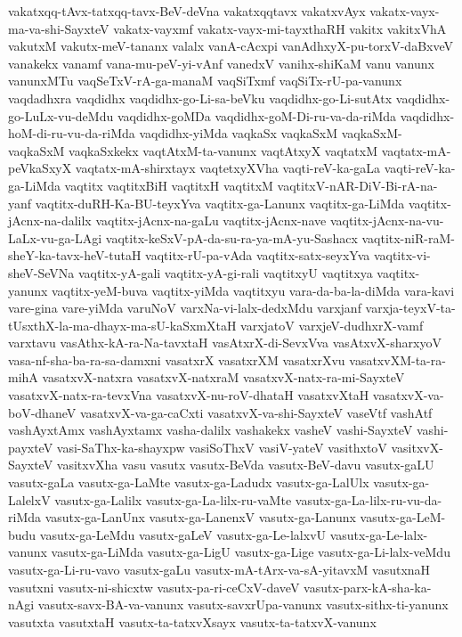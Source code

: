 {vakatxqq-tAvx-tatxqq-tavx-BeV-deVna
vakatxqqtavx
vakatxvAyx
vakatx-vayx-ma-va-shi-SayxteV
vakatx-vayxmf
vakatx-vayx-mi-tayxthaRH
vakitx
vakitxVhA
vakutxM
vakutx-meV-tananx
valalx
vanA-cAcxpi
vanAdhxyX-pu-torxV-daBxveV
vanakekx
vanamf
vana-mu-peV-yi-vAnf
vanedxV
vanihx-shiKaM
vanu
vanunx
vanunxMTu
vaqSeTxV-rA-ga-manaM
vaqSiTxmf
vaqSiTx-rU-pa-vanunx
vaqdadhxra
vaqdidhx
vaqdidhx-go-Li-sa-beVku
vaqdidhx-go-Li-sutAtx
vaqdidhx-go-LuLx-vu-deMdu
vaqdidhx-goMDa
vaqdidhx-goM-Di-ru-va-da-riMda
vaqdidhx-hoM-di-ru-vu-da-riMda
vaqdidhx-yiMda
vaqkaSx
vaqkaSxM
vaqkaSxM-vaqkaSxM
vaqkaSxkekx
vaqtAtxM-ta-vanunx
vaqtAtxyX
vaqtatxM
vaqtatx-mA-peVkaSxyX
vaqtatx-mA-shirxtayx
vaqtetxyXVha
vaqti-reV-ka-gaLa
vaqti-reV-ka-ga-LiMda
vaqtitx
vaqtitxBiH
vaqtitxH
vaqtitxM
vaqtitxV-nAR-DiV-Bi-rA-na-yanf
vaqtitx-duRH-Ka-BU-teyxYva
vaqtitx-ga-Lanunx
vaqtitx-ga-LiMda
vaqtitx-jAcnx-na-dalilx
vaqtitx-jAcnx-na-gaLu
vaqtitx-jAcnx-nave
vaqtitx-jAcnx-na-vu-LaLx-vu-ga-LAgi
vaqtitx-keSxV-pA-da-su-ra-ya-mA-yu-Sashacx
vaqtitx-niR-raM-sheY-ka-tavx-heV-tutaH
vaqtitx-rU-pa-vAda
vaqtitx-satx-seyxYva
vaqtitx-vi-sheV-SeVNa
vaqtitx-yA-gali
vaqtitx-yA-gi-rali
vaqtitxyU
vaqtitxya
vaqtitx-yanunx
vaqtitx-yeM-buva
vaqtitx-yiMda
vaqtitxyu
vara-da-ba-la-diMda
vara-kavi
vare-gina
vare-yiMda
varuNoV
varxNa-vi-lalx-dedxMdu
varxjanf
varxja-teyxV-ta-tUsxthX-la-ma-dhayx-ma-sU-kaSxmXtaH
varxjatoV
varxjeV-dudhxrX-vamf
varxtavu
vasAthx-kA-ra-Na-tavxtaH
vasAtxrX-di-SevxVva
vasAtxvX-sharxyoV
vasa-nf-sha-ba-ra-sa-damxni
vasatxrX
vasatxrXM
vasatxrXvu
vasatxvXM-ta-ra-mihA
vasatxvX-natxra
vasatxvX-natxraM
vasatxvX-natx-ra-mi-SayxteV
vasatxvX-natx-ra-tevxVna
vasatxvX-nu-roV-dhataH
vasatxvXtaH
vasatxvX-va-boV-dhaneV
vasatxvX-va-ga-caCxti
vasatxvX-va-shi-SayxteV
vaseVtf
vashAtf
vashAyxtAmx
vashAyxtamx
vasha-dalilx
vashakekx
vasheV
vashi-SayxteV
vashi-payxteV
vasi-SaThx-ka-shayxpw
vasiSoThxV
vasiV-yateV
vasithxtoV
vasitxvX-SayxteV
vasitxvXha
vasu
vasutx
vasutx-BeVda
vasutx-BeV-davu
vasutx-gaLU
vasutx-gaLa
vasutx-ga-LaMte
vasutx-ga-Ladudx
vasutx-ga-LalUlx
vasutx-ga-LalelxV
vasutx-ga-Lalilx
vasutx-ga-La-lilx-ru-vaMte
vasutx-ga-La-lilx-ru-vu-da-riMda
vasutx-ga-LanUnx
vasutx-ga-LanenxV
vasutx-ga-Lanunx
vasutx-ga-LeM-budu
vasutx-ga-LeMdu
vasutx-gaLeV
vasutx-ga-Le-lalxvU
vasutx-ga-Le-lalx-vanunx
vasutx-ga-LiMda
vasutx-ga-LigU
vasutx-ga-Lige
vasutx-ga-Li-lalx-veMdu
vasutx-ga-Li-ru-vavo
vasutx-gaLu
vasutx-mA-tArx-va-sA-yitavxM
vasutxnaH
vasutxni
vasutx-ni-shicxtw
vasutx-pa-ri-ceCxV-daveV
vasutx-parx-kA-sha-ka-nAgi
vasutx-savx-BA-va-vanunx
vasutx-savxrUpa-vanunx
vasutx-sithx-ti-yanunx
vasutxta
vasutxtaH
vasutx-ta-tatxvXsayx
vasutx-ta-tatxvX-vanunx
}
